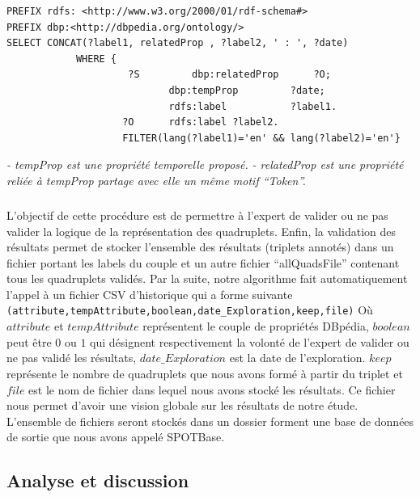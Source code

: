 \documentclass[12pt,a4	]{report}
\begin{document}
\begin{verbatim}
PREFIX rdfs: <http://www.w3.org/2000/01/rdf-schema#> 
PREFIX dbp:<http://dbpedia.org/ontology/> 
SELECT CONCAT(?label1, relatedProp , ?label2, ' : ', ?date) 
			WHERE {  
					 ?S   		dbp:relatedProp 	 ?O;
							dbp:tempProp		 ?date;
							rdfs:label 			 ?label1.
					?O 		rdfs:label ?label2.
					FILTER(lang(?label1)='en' && lang(?label2)='en'}
\end{verbatim}
{\it - tempProp est une propriété temporelle proposé.}
\newline
{\it - relatedProp est une propriété reliée à tempProp partage avec elle un même motif ``Token''.}
\subparagraph{}
L'objectif de cette procédure est de permettre à l'expert de valider ou ne pas valider la logique de la représentation des quadruplets. Enfin, la validation des résultats permet de stocker l'ensemble des résultats (triplets annotés) dans un fichier portant les labels du couple et un autre fichier ``allQuadsFile'' contenant tous les quadruplets validés. Par la suite, notre algorithme fait automatiquement l'appel à un fichier CSV d'historique qui a forme suivante 
\newline
{\tt (attribute,tempAttribute,boolean,date\_Exploration,keep,file)} 
\newline
Où $attribute$ et $tempAttribute$ représentent le couple de propriétés DBpédia, $boolean$ peut être $0$ ou $1$ qui désignent respectivement la volonté de l'expert de valider ou ne pas validé les résultats, $date\_Exploration$ est la date de l'exploration. $keep$ représente le nombre de quadruplets que nous avons formé à partir du triplet et $file$ est le nom de fichier dans lequel nous avons stocké les résultats.
Ce fichier nous permet d'avoir une vision globale sur les résultats de notre étude.
L'ensemble de fichiers seront stockés dans un dossier forment une base de données de sortie que nous avons appelé SPOTBase.
\subsection{Analyse et discussion}
\end{document}
